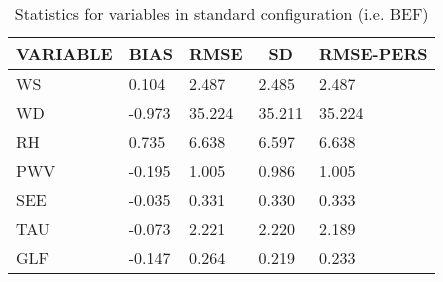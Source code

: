 \documentclass[11pt,english]{article}
\begin{document}
\clearpage
\begin{table}[]
\begin{center}
\begin{tabular}{|l|l|l|l|l|}
\hline
\multicolumn{1}{c|}{\cellcolor[HTML]{C0C0C0}\textbf{VARIABLE}} & \multicolumn{1}{c|}{\cellcolor[HTML]{C0C0C0}\textbf{BIAS}} & \multicolumn{1}{c|}{\cellcolor[HTML]{C0C0C0}\textbf{RMSE}} & \multicolumn{1}{c|}{\cellcolor[HTML]{C0C0C0}\textbf{SD}} & \multicolumn{1}{c|}{\cellcolor[HTML]{C0C0C0}\textbf{RMSE-PERS}}\\\hline
\cellcolor[HTML]{C0C0C0}WS  &     0.104                                &     2.487                                &     2.485  &     2.487 \\
\cellcolor[HTML]{C0C0C0}WD  &    -0.973                                &    35.224                                &    35.211  &    35.224 \\
\cellcolor[HTML]{C0C0C0}RH  &     0.735                                &     6.638                                &     6.597  &     6.638 \\
\cellcolor[HTML]{C0C0C0}PWV &    -0.195                               &     1.005                               &     0.986 &     1.005 \\
\cellcolor[HTML]{C0C0C0}SEE &    -0.035                               &     0.331                               &     0.330 &     0.333 \\
\cellcolor[HTML]{C0C0C0}TAU &    -0.073                               &     2.221                               &     2.220 &     2.189 \\
\cellcolor[HTML]{C0C0C0}GLF &    -0.147                               &     0.264                               &     0.219 &     0.233 \\
\hline
\end{tabular}
\caption{Statistics for variables in standard configuration (i.e. BEF)}
\end{center}
\end{table}
\end{document}
